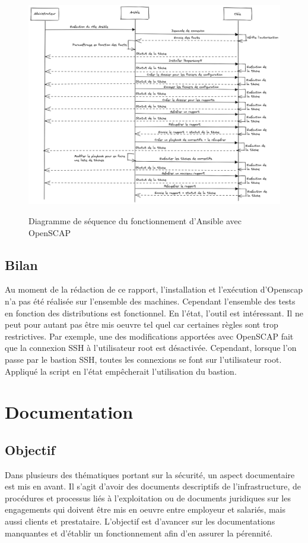 \documentclass[12pt, a4paper, twoside]{article}
\begin{document}
\begin{figure}[!ht]
    \centering
    \includegraphics[width=\textwidth]{src/graph_ansible_oscap.png}
    \label{fig:ansible_oscap}
    \caption{Diagramme de séquence du fonctionnement d'\gls{Ansible} avec OpenSCAP}
\end{figure}

\newpage
\subsection{Bilan}
Au moment de la rédaction de ce rapport, l'installation et l'exécution d'Openscap n'a pas été réalisée sur l'ensemble des machines. 
Cependant l'ensemble des tests en fonction des distributions est fonctionnel.
En l'état, l'outil est intéressant. 
Il ne peut pour autant pas être mis oeuvre tel quel car certaines règles sont trop restrictives.
Par exemple, une des modifications apportées avec \gls{OpenSCAP} fait que la connexion SSH à l'utilisateur root est désactivée.
Cependant, lorsque l'on passe par le bastion SSH, toutes les connexions se font sur l'utilisateur root.
Appliqué la script en l'état empêcherait l'utilisation du bastion.

\newpage
\section{Documentation}
\subsection{Objectif}
Dans plusieurs des thématiques portant sur la sécurité, un aspect documentaire est mis en avant. 
Il s'agit d'avoir des documents descriptifs de l'infrastructure, de procédures et processus liés à l'exploitation ou de documents juridiques sur les engagements qui doivent être mis en oeuvre entre employeur et salariés, mais aussi clients et prestataire. 
L'objectif est d'avancer sur les documentations manquantes et d'établir un fonctionnement afin d'en assurer la pérennité.
\end{document}
